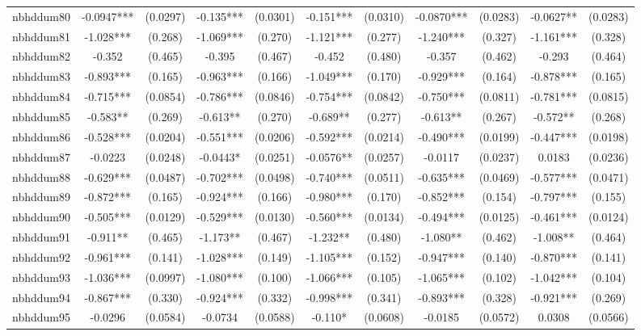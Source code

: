 \documentclass[]{article}
\begin{document}
\begin{tabular}{lcccccccccc}
nbhddum80 & -0.0947*** & (0.0297) & -0.135*** & (0.0301) & -0.151*** & (0.0310) & -0.0870*** & (0.0283) & -0.0627** & (0.0283) \\
nbhddum81 & -1.028*** & (0.268) & -1.069*** & (0.270) & -1.121*** & (0.277) & -1.240*** & (0.327) & -1.161*** & (0.328) \\
nbhddum82 & -0.352 & (0.465) & -0.395 & (0.467) & -0.452 & (0.480) & -0.357 & (0.462) & -0.293 & (0.464) \\
nbhddum83 & -0.893*** & (0.165) & -0.963*** & (0.166) & -1.049*** & (0.170) & -0.929*** & (0.164) & -0.878*** & (0.165) \\
nbhddum84 & -0.715*** & (0.0854) & -0.786*** & (0.0846) & -0.754*** & (0.0842) & -0.750*** & (0.0811) & -0.781*** & (0.0815) \\
nbhddum85 & -0.583** & (0.269) & -0.613** & (0.270) & -0.689** & (0.277) & -0.613** & (0.267) & -0.572** & (0.268) \\
nbhddum86 & -0.528*** & (0.0204) & -0.551*** & (0.0206) & -0.592*** & (0.0214) & -0.490*** & (0.0199) & -0.447*** & (0.0198) \\
nbhddum87 & -0.0223 & (0.0248) & -0.0443* & (0.0251) & -0.0576** & (0.0257) & -0.0117 & (0.0237) & 0.0183 & (0.0236) \\
nbhddum88 & -0.629*** & (0.0487) & -0.702*** & (0.0498) & -0.740*** & (0.0511) & -0.635*** & (0.0469) & -0.577*** & (0.0471) \\
nbhddum89 & -0.872*** & (0.165) & -0.924*** & (0.166) & -0.980*** & (0.170) & -0.852*** & (0.154) & -0.797*** & (0.155) \\
nbhddum90 & -0.505*** & (0.0129) & -0.529*** & (0.0130) & -0.560*** & (0.0134) & -0.494*** & (0.0125) & -0.461*** & (0.0124) \\
nbhddum91 & -0.911** & (0.465) & -1.173** & (0.467) & -1.232** & (0.480) & -1.080** & (0.462) & -1.008** & (0.464) \\
nbhddum92 & -0.961*** & (0.141) & -1.028*** & (0.149) & -1.105*** & (0.152) & -0.947*** & (0.140) & -0.870*** & (0.141) \\
nbhddum93 & -1.036*** & (0.0997) & -1.080*** & (0.100) & -1.066*** & (0.105) & -1.065*** & (0.102) & -1.042*** & (0.104) \\
nbhddum94 & -0.867*** & (0.330) & -0.924*** & (0.332) & -0.998*** & (0.341) & -0.893*** & (0.328) & -0.921*** & (0.269) \\
nbhddum95 & -0.0296 & (0.0584) & -0.0734 & (0.0588) & -0.110* & (0.0608) & -0.0185 & (0.0572) & 0.0308 & (0.0566) \\

\end{tabular}
\end{document}
